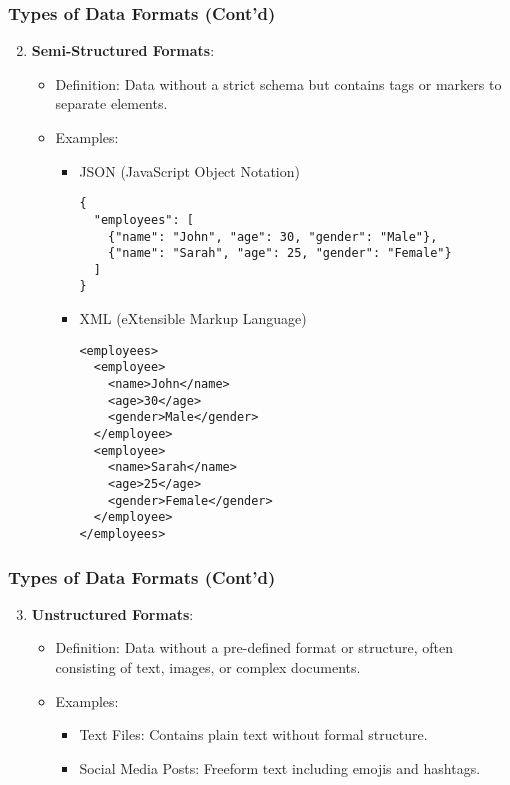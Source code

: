 \documentclass[aspectratio=169]{beamer}
\begin{document}
\begin{frame}[fragile]
    \frametitle{Types of Data Formats (Cont'd)}
    \begin{enumerate}
        \setcounter{enumi}{1} %
        \item \textbf{Semi-Structured Formats}:
            \begin{itemize}
                \item Definition: Data without a strict schema but contains tags or markers to separate elements.
                \item Examples: 
                    \begin{itemize}
                        \item JSON (JavaScript Object Notation)
                        \begin{lstlisting}[basicstyle=\ttfamily]
{
  "employees": [
    {"name": "John", "age": 30, "gender": "Male"},
    {"name": "Sarah", "age": 25, "gender": "Female"}
  ]
}
                        \end{lstlisting}
                        \item XML (eXtensible Markup Language)
                        \begin{lstlisting}[basicstyle=\ttfamily]
<employees>
  <employee>
    <name>John</name>
    <age>30</age>
    <gender>Male</gender>
  </employee>
  <employee>
    <name>Sarah</name>
    <age>25</age>
    <gender>Female</gender>
  </employee>
</employees>
                        \end{lstlisting}
                    \end{itemize}
            \end{itemize}
    \end{enumerate}
\end{frame}

\begin{frame}[fragile]
    \frametitle{Types of Data Formats (Cont'd)}
    \begin{enumerate}
        \setcounter{enumi}{2} %
        \item \textbf{Unstructured Formats}:
            \begin{itemize}
                \item Definition: Data without a pre-defined format or structure, often consisting of text, images, or complex documents.
                \item Examples: 
                    \begin{itemize}
                        \item Text Files: Contains plain text without formal structure.
                        \item Social Media Posts: Freeform text including emojis and hashtags.
                    \end{itemize}
            \end{itemize}
    \end{enumerate}
\end{frame}
\end{document}
